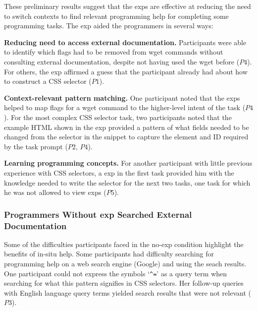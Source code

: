 


These preliminary results suggest that the \glspl{exp} are effective at reducing the need to switch contexts to find relevant programming help  for completing some programming tasks. 
The \gls{exp} aided the programmers in several ways:

{\bf Reducing need to access external documentation.}
Participants were  able to identify which flags had to be removed from wget commands without consulting external documentation, despite not having used the wget before ($P4$).
For others, the \gls{exp} affirmed a guess that the participant already had about how to construct a CSS selector ($P1$).

{\bf Context-relevant pattern matching.}
One participant noted that the \glspl{exp} helped  to map flags for a wget command to the higher-level intent of the task ($P4$). 
For the most complex CSS selector task, two participants noted
that the example HTML shown in the \gls{exp} 
provided a pattern of what fields needed to be changed  from the selector in the snippet to capture the element and ID required by the task prompt ($P2$, $P4$).

{\bf Learning programming concepts.}
For another participant with little previous experience with CSS selectors, a \gls{exp} in  the first task provided him with the knowledge needed to write the selector for the next two tasks, one task for which he was not allowed to view \glspl{exp} ($P5$).

\subsubsection{Programmers Without \Gls{exp} Searched External Documentation}

Some of the difficulties participants faced in the no-\gls{exp} condition  highlight the benefits of in-situ help.
Some participants had difficulty searching for programming help on a web search engine (Google) and using the seach results.
One participant could not express the symbols `\texttt{\^{}=}' as a query term when searching for what  this pattern signifies in CSS selectors.
Her follow-up queries with English language query terms  yielded search results that were not relevant ($P3$).

